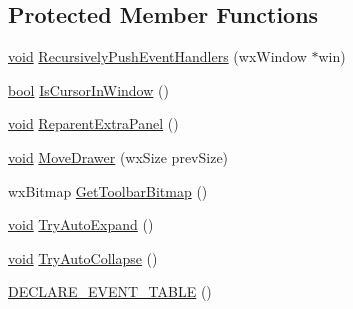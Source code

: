 \subsection*{Protected Member Functions}
\begin{DoxyCompactItemize}
\item 
\hyperlink{sound_8c_ae35f5844602719cf66324f4de2a658b3}{void} \hyperlink{class_expanding_tool_bar_a21c9edebbbbc1e37176aa16b42322f1c}{Recursively\+Push\+Event\+Handlers} (wx\+Window $\ast$win)
\item 
\hyperlink{mac_2config_2i386_2lib-src_2libsoxr_2soxr-config_8h_abb452686968e48b67397da5f97445f5b}{bool} \hyperlink{class_expanding_tool_bar_adc970754cece3aced02ac909cedf8d39}{Is\+Cursor\+In\+Window} ()
\item 
\hyperlink{sound_8c_ae35f5844602719cf66324f4de2a658b3}{void} \hyperlink{class_expanding_tool_bar_a065129cbbf650379a9b3f984a7b27751}{Reparent\+Extra\+Panel} ()
\item 
\hyperlink{sound_8c_ae35f5844602719cf66324f4de2a658b3}{void} \hyperlink{class_expanding_tool_bar_a21cfa255097fb6cba41db751c7562e4d}{Move\+Drawer} (wx\+Size prev\+Size)
\item 
wx\+Bitmap \hyperlink{class_expanding_tool_bar_ad8449959a3c4ffaac689a55e5a844e90}{Get\+Toolbar\+Bitmap} ()
\item 
\hyperlink{sound_8c_ae35f5844602719cf66324f4de2a658b3}{void} \hyperlink{class_expanding_tool_bar_aa40bbdf6fe51ffaec942e3170855c6bf}{Try\+Auto\+Expand} ()
\item 
\hyperlink{sound_8c_ae35f5844602719cf66324f4de2a658b3}{void} \hyperlink{class_expanding_tool_bar_a9e779dc6eda01841a843948ce2344217}{Try\+Auto\+Collapse} ()
\item 
\hyperlink{class_expanding_tool_bar_ad71bd4a7696fe2e47f60ffd79938944a}{D\+E\+C\+L\+A\+R\+E\+\_\+\+E\+V\+E\+N\+T\+\_\+\+T\+A\+B\+LE} ()
\end{DoxyCompactItemize}
